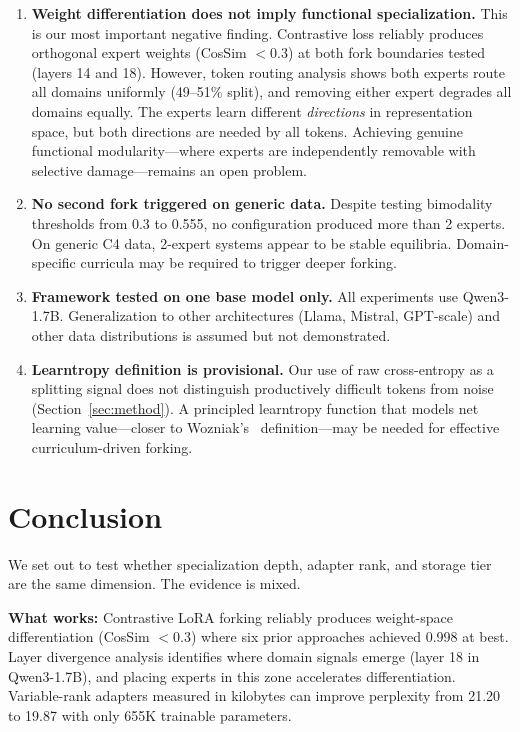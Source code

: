 \documentclass{article}
\begin{document}
\begin{enumerate}
    \item \textbf{Weight differentiation does not imply functional
          specialization.} This is our most important negative finding.
          Contrastive loss reliably produces orthogonal expert weights
          (CosSim $<$0.3) at both fork boundaries tested (layers 14 and 18).
          However, token routing analysis shows both experts route all domains
          uniformly (49--51\% split), and removing either expert degrades all
          domains equally. The experts learn different \emph{directions} in
          representation space, but both directions are needed by all tokens.
          Achieving genuine functional modularity---where experts are
          independently removable with selective damage---remains an open
          problem.
    \item \textbf{No second fork triggered on generic data.} Despite testing
          bimodality thresholds from 0.3 to 0.555, no configuration produced
          more than 2 experts. On generic C4 data, 2-expert systems appear to
          be stable equilibria. Domain-specific curricula may be required to
          trigger deeper forking.
    \item \textbf{Framework tested on one base model only.} All experiments use
          Qwen3-1.7B. Generalization to other architectures (Llama, Mistral,
          GPT-scale) and other data distributions is assumed but not
          demonstrated.
    \item \textbf{Learntropy definition is provisional.} Our use of raw
          cross-entropy as a splitting signal does not distinguish productively
          difficult tokens from noise (Section~\ref{sec:method}). A principled
          learntropy function that models net learning value---closer to
          Wozniak's~\cite{wozniak2018learntropy} definition---may be needed
          for effective curriculum-driven forking.
\end{enumerate}

\section{Conclusion}

We set out to test whether specialization depth, adapter rank, and storage tier
are the same dimension. The evidence is mixed.

\textbf{What works:} Contrastive LoRA forking reliably produces weight-space
differentiation (CosSim $<$0.3) where six prior approaches achieved 0.998 at
best. Layer divergence analysis identifies where domain signals emerge (layer
18 in Qwen3-1.7B), and placing experts in this zone accelerates
differentiation. Variable-rank adapters measured in kilobytes can improve
perplexity from 21.20 to 19.87 with only 655K trainable parameters.
\end{document}
